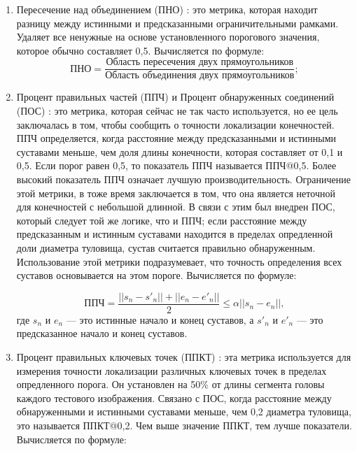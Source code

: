 \begin{enumerate}[label=\arabic*)]
	
	\item Пересечение над объединением (ПНО) \cite{IoU}: это метрика, которая находит разницу между истинными и предсказанными ограничительными рамками.
	Удаляет все ненужные на основе установленного порогового значения, которое обычно составляет 0,5.
	Вычисляется по формуле:
	\begin{equation}
		\text{ПНО} = \frac{\text{Область пересечения двух прямоугольников}}{\text{Область объединения двух прямоугольников}};
	\end{equation}
	
	\item Процент правильных частей (ППЧ) и Процент обнаруженных соединений (ПОС) \cite{PDJ}: это метрика, которая сейчас не так часто используется, но ее цель заключалась в том, чтобы сообщить о точности локализации конечностей.
	ППЧ определяется, когда расстояние между предсказанными и истинными суставами меньше, чем доля длины конечности, которая составляет от 0,1 и 0,5.
	Если порог равен 0,5, то показатель ППЧ называется ППЧ@0,5.
	Более высокий показатель ППЧ означает лучшую производительность.
	Ограничение этой метрики, в тоже время заключается в том, что она является неточной для конечностей с небольшой длинной.
	В связи с этим был внедрен ПОС, который следует той же логике, что и ППЧ; если расстояние между предсказанным и истинным суставами находится в пределах опредленной доли диаметра туловища, сустав считается правильно обнаруженным.
	Использование этой метрики подразумевает, что точность определения всех суставов основывается на этом пороге.
	Вычисляется по формуле:
	
	\begin{equation}
		\text{ППЧ} =  \frac{||s_n - s'_n|| + ||e_n - e'_n||}{2} \leq \alpha ||s_n - e_n||,
	\end{equation}
	где $s_n$ и $e_n$ --- это истинные начало и конец суставов, а $s'_n$ и $e'_n$ --- это предсказанное начало и конец суставов.
		
	\item Процент правильных ключевых точек  (ППКТ) \cite{guide-hpe}: эта метрика используется для измерения точности локализации различных ключевых точек в пределах опредленного порога.
	Он установлен на 50\% от длины сегмента головы каждого тестового изображения.
	Связано с ПОС, когда расстояние между обнаруженными и истинными суставами меньше, чем 0,2 диаметра туловища, это называется ППКТ@0,2.
	Чем выше значение ППКТ, тем лучше показатели.
	Вычисляется по формуле:
	

\end{enumerate}
